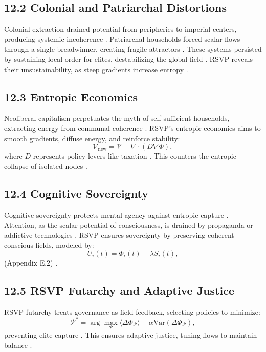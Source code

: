 \documentclass[12pt]{article}
\begin{document}
{{\subsection*{12.2 Colonial and Patriarchal Distortions}

Colonial extraction drained potential from peripheries to imperial centers, producing systemic incoherence \citep{ortega1957}. Patriarchal households forced scalar flows through a single breadwinner, creating fragile attractors \citep{zuboff2019}. These systems persisted by sustaining local order for elites, destabilizing the global field \citep{deleuze1987}. RSVP reveals their unsustainability, as steep gradients increase entropy \citep{jaynes2003}.

\subsection*{12.3 Entropic Economics}

Neoliberal capitalism perpetuates the myth of self-sufficient households, extracting energy from communal coherence \citep{zuboff2019}. RSVP’s entropic economics aims to smooth gradients, diffuse energy, and reinforce stability:
\[
\mathcal{V}_{\text{new}} = \mathcal{V} - \nabla \cdot (D \nabla \Phi),
\]
where \(D\) represents policy levers like taxation \citep{cover2006}. This counters the entropic collapse of isolated nodes \citep{lanier2018}.

\subsection*{12.4 Cognitive Sovereignty}

Cognitive sovereignty protects mental agency against entropic capture \citep{ortega1957}. Attention, as the scalar potential of consciousness, is drained by propaganda or addictive technologies \citep{lanier2018}. RSVP ensures sovereignty by preserving coherent conscious fields, modeled by:
\[
U_i(t) = \Phi_i(t) - \lambda S_i(t),
\]
(Appendix E.2) \citep{hanson2003}.

\subsection*{12.5 RSVP Futarchy and Adaptive Justice}

RSVP futarchy treats governance as field feedback, selecting policies to minimize:
\[
\mathcal{P}^* = \arg \max_{\mathcal{P}} \langle \Delta \Phi_{\mathcal{P}} \rangle - \alpha \mathrm{Var}(\Delta \Phi_{\mathcal{P}}),
\]
preventing elite capture \citep{hanson2003}. This ensures adaptive justice, tuning flows to maintain balance \citep{whitehead1978}.

}}
\end{document}
